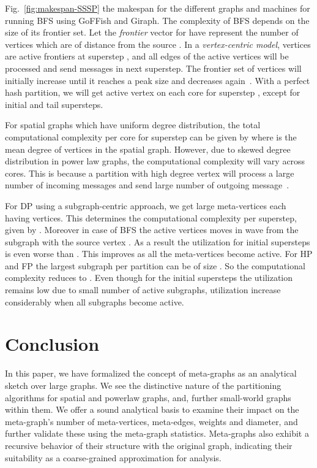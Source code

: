 \documentclass[10pt,conference, compsocconf]{IEEEtran}
\begin{document}
Fig.~\ref{fig:makespan-SSSP} the makespan for the different graphs and machines for running BFS using GoFFish and Giraph. The complexity of BFS depends on the size of its frontier set. Let the \emph{frontier} vector  for  have  represent the number of vertices which are of distance  from the source . In a \emph{vertex-centric model},  vertices are active frontiers at superstep , and all edges of the active vertices will be processed and send messages in next superstep. The frontier set of vertices will initially increase until it reaches a peak size and decreases again~\cite{beamer2013direction}.  With a perfect hash partition, we will get  active vertex on each core for superstep , except for initial and tail supersteps.
 
 For spatial graphs which have uniform degree distribution, the total computational complexity per core for superstep  can be given by  where  is the mean degree of vertices in the spatial graph. However, due to skewed degree distribution in power law graphs, the computational complexity will vary across cores. This is because a partition with high degree vertex will process a large number of incoming messages and send large number of outgoing message~\cite{graphlab}.
 

For DP using a subgraph-centric approach, we get  large meta-vertices each having  vertices. This determines the computational complexity per superstep, given by . Moreover in case of BFS the active vertices moves in wave from the subgraph with the source vertex . As a result the  utilization  for initial supersteps is even worse than . This improves as all the meta-vertices become active. For HP and FP the largest subgraph per partition can be of size . So the computational complexity reduces to . Even though for the initial supersteps the utilization remains low due to small number of active subgraphs, utilization increase considerably when all subgraphs become active.






\section{Conclusion}\label{sec:conclusion}


In this paper, we have formalized the concept of meta-graphs as an analytical sketch over large graphs. We see the distinctive nature of the  partitioning algorithms for spatial and powerlaw graphs, and, further small-world graphs within them. We offer a sound analytical basis to examine their impact on the meta-graph's number of meta-vertices, meta-edges, weights and diameter, and further validate these using the meta-graph statistics. Meta-graphs also exhibit a recursive behavior of their structure with the original graph, indicating their suitability as a coarse-grained approximation for analysis.
\end{document}
